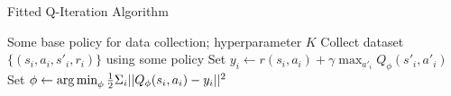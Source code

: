 \begin{algorithm}[t!]
\caption{Fitted Q-Iteration Algorithm}
\begin{algorithmic}[1]
\label{alg:fittedQ}
\REQUIRE Some base policy for data collection; hyperparameter $K$
    \STATE Collect dataset $\{(s_i,a_i,s'_i,r_i)\}$ using some policy
        \STATE Set $y_i\leftarrow r(s_i,a_i) + \gamma \max_{a'_i}Q_\phi(s'_i,a'_i)$
        \STATE Set $\phi \leftarrow \operatorname*{arg\,min}_\phi \frac{1}{2}\Sigma_i\lvert|Q_\phi(s_i,a_i) - y_i|\rvert^2$
    \ENDFOR
\ENDWHILE
\end{algorithmic}
\end{algorithm}